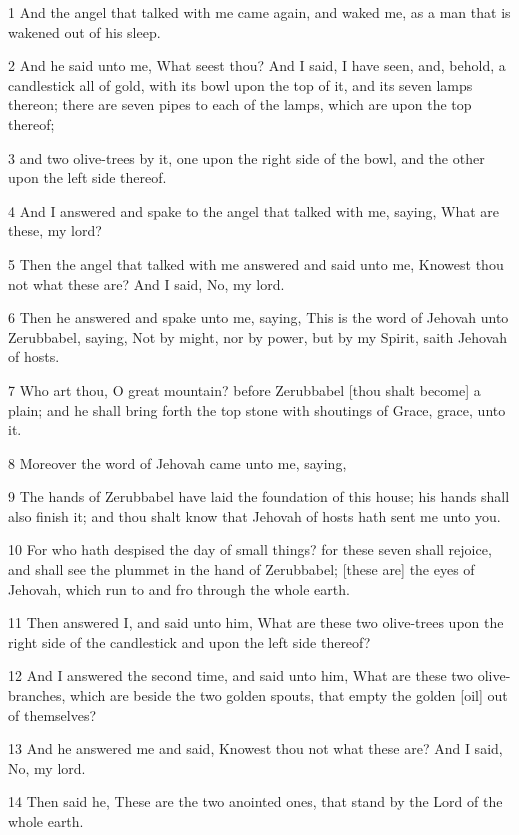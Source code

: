 \par 1 And the angel that talked with me came again, and waked me, as a man that is wakened out of his sleep.
\par 2 And he said unto me, What seest thou? And I said, I have seen, and, behold, a candlestick all of gold, with its bowl upon the top of it, and its seven lamps thereon; there are seven pipes to each of the lamps, which are upon the top thereof;
\par 3 and two olive-trees by it, one upon the right side of the bowl, and the other upon the left side thereof.
\par 4 And I answered and spake to the angel that talked with me, saying, What are these, my lord?
\par 5 Then the angel that talked with me answered and said unto me, Knowest thou not what these are? And I said, No, my lord.
\par 6 Then he answered and spake unto me, saying, This is the word of Jehovah unto Zerubbabel, saying, Not by might, nor by power, but by my Spirit, saith Jehovah of hosts.
\par 7 Who art thou, O great mountain? before Zerubbabel [thou shalt become] a plain; and he shall bring forth the top stone with shoutings of Grace, grace, unto it.
\par 8 Moreover the word of Jehovah came unto me, saying,
\par 9 The hands of Zerubbabel have laid the foundation of this house; his hands shall also finish it; and thou shalt know that Jehovah of hosts hath sent me unto you.
\par 10 For who hath despised the day of small things? for these seven shall rejoice, and shall see the plummet in the hand of Zerubbabel; [these are] the eyes of Jehovah, which run to and fro through the whole earth.
\par 11 Then answered I, and said unto him, What are these two olive-trees upon the right side of the candlestick and upon the left side thereof?
\par 12 And I answered the second time, and said unto him, What are these two olive-branches, which are beside the two golden spouts, that empty the golden [oil] out of themselves?
\par 13 And he answered me and said, Knowest thou not what these are? And I said, No, my lord.
\par 14 Then said he, These are the two anointed ones, that stand by the Lord of the whole earth.

